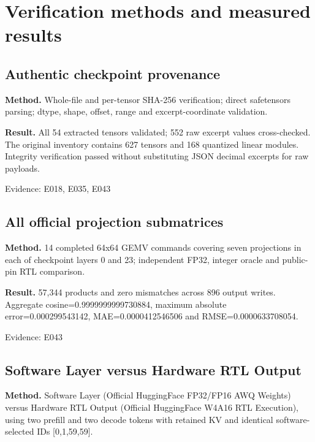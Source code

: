 \documentclass[11pt,a4paper]{article}
\begin{document}
\section{Verification methods and measured results}

\subsection{Authentic checkpoint provenance}

\textbf{Method.} Whole-file and per-tensor SHA-256 verification; direct safetensors parsing; dtype,\allowbreak{} shape,\allowbreak{} offset,\allowbreak{} range and excerpt-coordinate validation.

\textbf{Result.} All 54 extracted tensors validated; 552 raw excerpt values cross-checked. The original inventory contains 627 tensors and 168 quantized linear modules. Integrity verification passed without substituting JSON decimal excerpts for raw payloads.

{\small Evidence: E018,\allowbreak{} E035,\allowbreak{} E043}

\subsection{All official projection submatrices}

\textbf{Method.} 14 completed 64x64 GEMV commands covering seven projections in each of checkpoint layers 0 and 23; independent FP32,\allowbreak{} integer oracle and public-pin RTL comparison.

\textbf{Result.} 57,\allowbreak{}344 products and zero mismatches across 896 output writes. Aggregate cosine=\allowbreak{}0.9999999999730884,\allowbreak{} maximum absolute error=\allowbreak{}0.000299543142,\allowbreak{} MAE=\allowbreak{}0.0000412546506 and RMSE=\allowbreak{}0.0000633708054.

{\small Evidence: E043}

\subsection{Software Layer versus Hardware RTL Output}

\textbf{Method.} Software Layer (\allowbreak{}Official HuggingFace FP32/\allowbreak{}FP16 AWQ Weights)\allowbreak{} versus Hardware RTL Output (\allowbreak{}Official HuggingFace W4A16 RTL Execution)\allowbreak{},\allowbreak{} using two prefill and two decode tokens with retained KV and identical software-selected IDs [\allowbreak{}0,\allowbreak{}1,\allowbreak{}59,\allowbreak{}59]\allowbreak{}.
\end{document}

